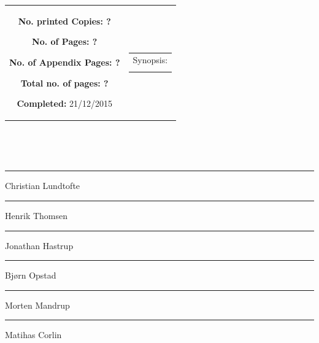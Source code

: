 {\begin{tabular}{cc}
{	\begin{description}
		\item { \textbf{No. printed Copies: ?} }
		\item { \textbf{No. of Pages: ?} } 
		\item { \textbf{No. of Appendix Pages: ?} }
		\item { \textbf{Total no. of pages: ?} } 
		\item { \textbf{Completed:} 21/12/2015}
	\end{description}
	\vfill } &
	\parbox{7cm}{
 	 \vspace{.15cm}
  	\hfill 
  	\begin{tabular}{l}
  		{ Synopsis:}\bigskip \\
  		\fbox{
  		\parbox{6.5cm}{\bigskip
     		{\vfill{\small 
     		\bigskip}}
     	}}
   	\end{tabular}}
\end{tabular}
}%
\\
\vfill
{}

\null\vfill
\begin{center}\hspace*{\fill} \\[5cm]
\begin{minipage}{0.4\textwidth}
\begin{flushleft} \large
{\rule{\linewidth}{0.5mm}}
Christian Lundtofte\\[2cm]
{\rule{\linewidth}{0.5mm}}
Henrik Thomsen\\[2cm]
{\rule{\linewidth}{0.5mm}}
Jonathan Hastrup\\[2cm]
\end{flushleft}
\end{minipage}
\begin{minipage}{0.4\textwidth}
\begin{flushright} \large
{\rule{\linewidth}{0.5mm}}
Bjørn Opstad\\[2cm]
{\rule{\linewidth}{0.5mm}}
Morten Mandrup\\[2cm]
{\rule{\linewidth}{0.5mm}}
Matihas Corlin\\[2cm]
\end{flushright}
\end{minipage}

\end{center}
\vfill\clearpage

%